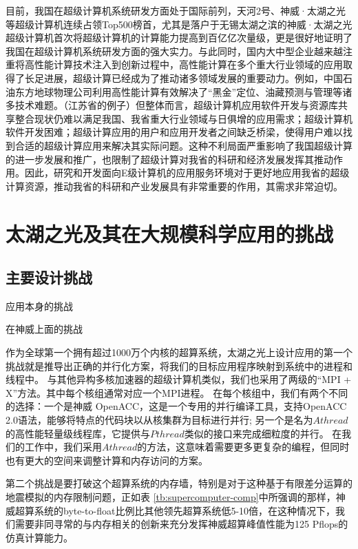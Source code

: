 \documentclass[degree=doctor]{thuthesis}
\begin{document}
目前，我国在超级计算机系统研发方面处于国际前列，天河2号、神威·太湖之光等超级计算机连续占领Top500榜首，尤其是落户于无锡太湖之滨的神威·太湖之光超级计算机首次将超级计算机的计算能力提高到百亿亿次量级，更是很好地证明了我国在超级计算机系统研发方面的强大实力。与此同时，国内大中型企业越来越注重将高性能计算技术注入到创新过程中，高性能计算在多个重大行业领域的应用取得了长足进展，超级计算已经成为了推动诸多领域发展的重要动力。例如，中国石油东方地球物理公司利用高性能计算有效解决了“黑金”定位、油藏预测与管理等诸多技术难题。（江苏省的例子）但整体而言，超级计算机应用软件开发与资源库共享整合现状仍难以满足我国、我省重大行业领域与日俱增的应用需求；超级计算机软件开发困难；超级计算应用的用户和应用开发者之间缺乏桥梁，使得用户难以找到合适的超级计算应用来解决其实际问题。这种不利局面严重影响了我国超级计算的进一步发展和推广，也限制了超级计算对我省的科研和经济发展发挥其推动作用。因此，研究和开发面向E级计算机的应用服务环境对于更好地应用我省的超级计算资源，推动我省的科研和产业发展具有非常重要的作用，其需求非常迫切。

\section{太湖之光及其在大规模科学应用的挑战}
\label{sec:sunway}



\subsection{主要设计挑战}
\label{sec:sunway-challenge}

应用本身的挑战

在神威上面的挑战

作为全球第一个拥有超过1000万个内核的超算系统，太湖之光上设计应用的第一个挑战就是推导出正确的并行化方案，将我们的目标应用程序映射到系统中的进程和线程中。 与其他异构多核加速器的超级计算机类似，我们也采用了两级的“MPI + X”方法。其中每个核组通常对应一个MPI进程。 在每个核组中，我们有两个不同的选择：一个是神威 OpenACC，这是一个专用的并行编译工具，支持OpenACC 2.0语法，能够将特点的代码块以从核集群为目标进行并行; 另一个是名为$ Athread$的高性能轻量级线程库，它提供与$ Pthread $类似的接口来完成细粒度的并行。 在我们的工作中，我们采用$ Athread $的方法，这意味着需要更多更复杂的编程，但同时也有更大的空间来调整计算和内存访问的方案。

第二个挑战是要打破这个超算系统的内存墙，特别是对于这种基于有限差分运算的地震模拟的内存限制问题，正如表 \ref {tb:supercomputer-comp}中所强调的那样，神威超算系统的byte-to-float比例比其他领先超算系统低5-10倍，在这种情况下，我们需要非同寻常的与内存相关的创新来充分发挥神威超算峰值性能为125 Pflops的仿真计算能力。
\end{document}
